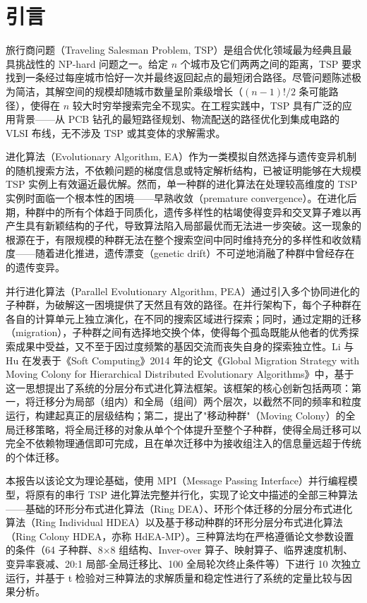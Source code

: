 \section{引言}

旅行商问题（Traveling Salesman Problem, TSP）是组合优化领域最为经典且最具挑战性的 NP-hard 问题之一。给定 $n$ 个城市及它们两两之间的距离，TSP 要求找到一条经过每座城市恰好一次并最终返回起点的最短闭合路径。尽管问题陈述极为简洁，其解空间的规模却随城市数量呈阶乘级增长（$(n-1)!/2$ 条可能路径），使得在 $n$ 较大时穷举搜索完全不现实。在工程实践中，TSP 具有广泛的应用背景——从 PCB 钻孔的最短路径规划、物流配送的路径优化到集成电路的 VLSI 布线，无不涉及 TSP 或其变体的求解需求。

进化算法（Evolutionary Algorithm, EA）作为一类模拟自然选择与遗传变异机制的随机搜索方法，不依赖问题的梯度信息或特定解析结构，已被证明能够在大规模 TSP 实例上有效逼近最优解。然而，单一种群的进化算法在处理较高维度的 TSP 实例时面临一个根本性的困境——早熟收敛（premature convergence）。在进化后期，种群中的所有个体趋于同质化，遗传多样性的枯竭使得变异和交叉算子难以再产生具有新颖结构的子代，导致算法陷入局部最优而无法进一步突破。这一现象的根源在于，有限规模的种群无法在整个搜索空间中同时维持充分的多样性和收敛精度——随着进化推进，遗传漂变（genetic drift）不可逆地消融了种群中曾经存在的遗传变异。

并行进化算法（Parallel Evolutionary Algorithm, PEA）通过引入多个协同进化的子种群，为破解这一困境提供了天然且有效的路径。在并行架构下，每个子种群在各自的计算单元上独立演化，在不同的搜索区域进行探索；同时，通过定期的迁移（migration），子种群之间有选择地交换个体，使得每个孤岛既能从他者的优秀探索成果中受益，又不至于因过度频繁的基因交流而丧失自身的探索独立性。Li 与 Hu 在发表于《Soft Computing》2014 年的论文《Global Migration Strategy with Moving Colony for Hierarchical Distributed Evolutionary Algorithms》中，基于这一思想提出了系统的分层分布式进化算法框架。该框架的核心创新包括两项：第一，将迁移分为局部（组内）和全局（组间）两个层次，以截然不同的频率和粒度运行，构建起真正的层级结构；第二，提出了"移动种群"（Moving Colony）的全局迁移策略，将全局迁移的对象从单个个体提升至整个子种群，使得全局迁移可以完全不依赖物理通信即可完成，且在单次迁移中为接收组注入的信息量远超于传统的个体迁移。

本报告以该论文为理论基础，使用 MPI（Message Passing Interface）并行编程模型，将原有的串行 TSP 进化算法完整并行化，实现了论文中描述的全部三种算法——基础的环形分布式进化算法（Ring DEA）、环形个体迁移的分层分布式进化算法（Ring Individual HDEA）以及基于移动种群的环形分层分布式进化算法（Ring Colony HDEA，亦称 HdEA-MP）。三种算法均在严格遵循论文参数设置的条件（64 子种群、8×8 组结构、Inver-over 算子、映射算子、临界速度机制、变异率衰减、20:1 局部-全局迁移比、100 全局轮次终止条件等）下进行 10 次独立运行，并基于 t 检验对三种算法的求解质量和稳定性进行了系统的定量比较与因果分析。
